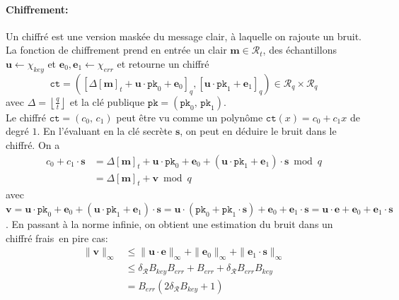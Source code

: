 \documentclass[11pt, headsepline, a4paper, fleqn, oneside]{article}
\begin{document}
\paragraph{Chiffrement:} 
Un chiffré est une version maskée du message clair, à laquelle on rajoute un bruit. La fonction de chiffrement prend en entrée un clair $\boldsymbol{m}\in \mathcal{R}_t$, des échantillons $\boldsymbol{u} \leftarrow \chi_{key}$ et $\boldsymbol{e}_{0}, \boldsymbol{e}_{1} \leftarrow \chi_{err}$ et retourne un chiffré 
\begin{equation}
    \texttt{ct}=\left(\left[\Delta[\boldsymbol{m}]_{t}+\boldsymbol{u} \cdot \texttt{pk}_0+\boldsymbol{e}_{0}\right]_{q},\left[\boldsymbol{u} \cdot \texttt{pk}_1+\boldsymbol{e}_{1}\right]_{q}\right)\in \mathcal{R}_q \times \mathcal{R}_q
\end{equation}
avec $\Delta=\left\lfloor\frac{q}{t}\right\rfloor$ et la clé publique  $\texttt{pk} = (\texttt{pk}_0,\,\texttt{pk}_1)$.\\
Le chiffré $\texttt{ct}=(c_0,\,c_1)$ peut être vu comme un polynôme $\texttt{ct}(x)=c_0 + c_1 x$ de degré $1$. En l'évaluant en la clé secrète $\boldsymbol{s}$, on peut en déduire le bruit dans le chiffré.
On a $$\begin{aligned} c_{0}+c_{1} \cdot \boldsymbol{s} & = \Delta[\boldsymbol{m}]_{t}+\boldsymbol{u} \cdot \texttt{pk}_{0}+\boldsymbol{e}_{0}+\left(\boldsymbol{u} \cdot \texttt{pk}_{1}+\boldsymbol{e}_{1}\right) \cdot \boldsymbol{s} \bmod q \\ & = \Delta[\boldsymbol{m}]_{t}+\boldsymbol{v} \bmod q \end{aligned}$$
avec $\boldsymbol{v}=\boldsymbol{u} \cdot \texttt{pk}_{0}+\boldsymbol{e}_{0}+\left(\boldsymbol{u} \cdot \texttt{pk}_{1}+\boldsymbol{e}_{1}\right) \cdot \boldsymbol{s} = \boldsymbol{u} \cdot (\texttt{pk}_{0}+\texttt{pk}_{1}\cdot \boldsymbol{s}) +\boldsymbol{e}_{0} +\boldsymbol{e}_{1}\cdot \boldsymbol{s}=\boldsymbol{u} \cdot \boldsymbol{e} +\boldsymbol{e}_{0} +\boldsymbol{e}_{1}\cdot \boldsymbol{s}$.
En passant à la norme infinie, on obtient une estimation du bruit dans un chiffré \og frais\fg \ en pire cas:
\begin{equation} \label{eq:5}
\begin{aligned}
    \|\boldsymbol{v}\|_{\infty} & \leq \|\boldsymbol{u} \cdot \boldsymbol{e}\|_{\infty} + \|\boldsymbol{e}_{0}\|_{\infty} + \|\boldsymbol{e}_{1} \cdot \boldsymbol{s}\|_{\infty} \\& \leq \delta_{\mathcal{R}} B_{key} B_{err} + B_{err} + \delta_{\mathcal{R}} B_{err} B_{key} \\& = B_{err}(2\delta_{\mathcal{R}} B_{key} +1)
\end{aligned}
\end{equation}
\end{document}
